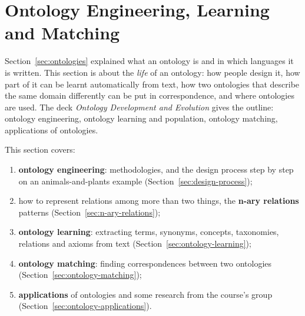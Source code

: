 \section{Ontology Engineering, Learning and Matching}
\label{sec:ontology-engineering}

Section~\ref{sec:ontologies} explained what an ontology is and in which languages it is
written. This section is about the \emph{life} of an ontology: how people design it, how
part of it can be learnt automatically from text, how two ontologies that describe the
same domain differently can be put in correspondence, and where ontologies are used.
The deck \emph{Ontology Development and Evolution} gives the outline: ontology
engineering, ontology learning and population, ontology matching, applications of
ontologies.

This section covers:
\begin{enumerate}[nosep]
  \item \textbf{ontology engineering}: methodologies, and the design process step by step
        on an animals-and-plants example (Section~\ref{sec:design-process});
  \item how to represent relations among more than two things, the \textbf{n-ary
        relations} patterns (Section~\ref{sec:n-ary-relations});
  \item \textbf{ontology learning}: extracting terms, synonyms, concepts, taxonomies,
        relations and axioms from text (Section~\ref{sec:ontology-learning});
  \item \textbf{ontology matching}: finding correspondences between two ontologies
        (Section~\ref{sec:ontology-matching});
  \item \textbf{applications} of ontologies and some research from the course's group
        (Section~\ref{sec:ontology-applications}).
\end{enumerate}






